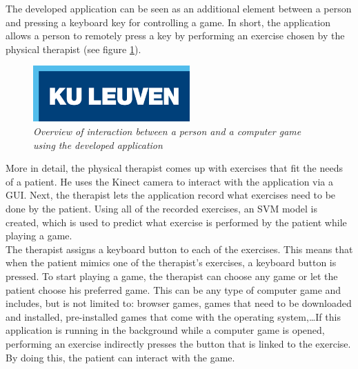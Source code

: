The developed application can be seen as an additional element between a person and pressing a keyboard key for controlling a game. In short, the application allows a person to remotely press a key by performing an exercise chosen by the physical therapist (see figure \ref{fig: overview_application_interaction}).\\

\begin{figure}[H]
\begin{center}
\includegraphics[width=6cm]{KUL.png} %
\caption{\emph{Overview of interaction between a person and a computer game using the developed application}}
\label{fig: overview_application_interaction}
\end{center}
\end{figure}

More in detail, the physical therapist comes up with exercises that fit the needs of a patient. He uses the Kinect camera to interact with the application via a GUI. Next, the therapist lets the application record what exercises need to be done by the patient. Using all of the recorded exercises, an SVM model is created, which is used to predict what exercise is performed by the patient while playing a game.\\

The therapist assigns a keyboard button to each of the exercises. This means that when the patient mimics one of the therapist's exercises, a keyboard button is pressed. To start playing a game, the therapist can choose any game or let the patient choose his preferred game. This can be any type of computer game and includes, but is not limited to: browser games, games that need to be downloaded and installed, pre-installed games that come with the operating system,\ldots If this application is running in the background while a computer game is opened, performing an exercise indirectly presses the button that is linked to the exercise. By doing this, the patient can interact with the game.\\

